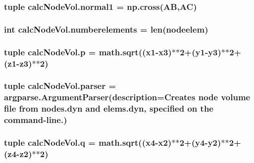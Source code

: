 \subsubsection[{normal1}]{\setlength{\rightskip}{0pt plus 5cm}tuple calc\+Node\+Vol.\+normal1 = np.\+cross({\bf A\+B},{\bf A\+C})}\label{namespacecalcNodeVol_a517a8b9eea5e927318263ea38b374120}
\hypertarget{namespacecalcNodeVol_a83369528f932f33ce1096ecd66b64fd9}{}
\subsubsection[{numberelements}]{\setlength{\rightskip}{0pt plus 5cm}int calc\+Node\+Vol.\+numberelements = len({\bf nodeelem})}\label{namespacecalcNodeVol_a83369528f932f33ce1096ecd66b64fd9}
\hypertarget{namespacecalcNodeVol_ad6706ade5073735fd447d18f0f3c2fc5}{}
\subsubsection[{p}]{\setlength{\rightskip}{0pt plus 5cm}tuple calc\+Node\+Vol.\+p = math.\+sqrt(({\bf x1}-\/{\bf x3})$\ast$$\ast$2+({\bf y1}-\/{\bf y3})$\ast$$\ast$2+({\bf z1}-\/{\bf z3})$\ast$$\ast$2)}\label{namespacecalcNodeVol_ad6706ade5073735fd447d18f0f3c2fc5}
\hypertarget{namespacecalcNodeVol_ac609e0d497500657ae472a13c3bcad73}{}
\subsubsection[{parser}]{\setlength{\rightskip}{0pt plus 5cm}tuple calc\+Node\+Vol.\+parser = argparse.\+Argument\+Parser(description=\textquotesingle{}Creates {\bf node} volume {\bf file} {\bf from} nodes.\+dyn and elems.\+dyn, specified {\bf on} the command-\/line.\textquotesingle{})}\label{namespacecalcNodeVol_ac609e0d497500657ae472a13c3bcad73}
\hypertarget{namespacecalcNodeVol_ae6dac76a036745b24de14068c29426af}{}
\subsubsection[{q}]{\setlength{\rightskip}{0pt plus 5cm}tuple calc\+Node\+Vol.\+q = math.\+sqrt(({\bf x4}-\/{\bf x2})$\ast$$\ast$2+({\bf y4}-\/{\bf y2})$\ast$$\ast$2+({\bf z4}-\/{\bf z2})$\ast$$\ast$2)}\label{namespacecalcNodeVol_ae6dac76a036745b24de14068c29426af}
\hypertarget{namespacecalcNodeVol_ad515c670133cb128abbbee303eec6972}{}
